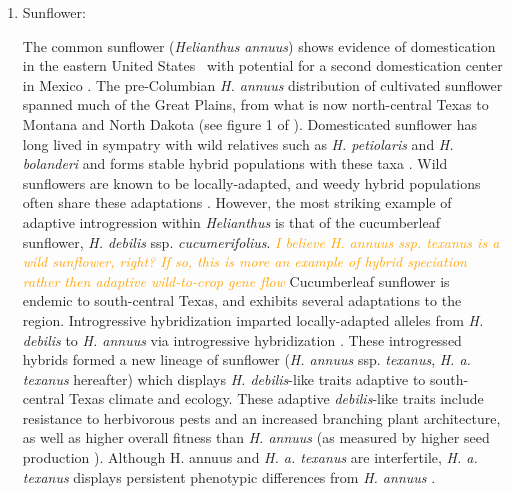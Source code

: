 \documentclass[11pt]{article}
\newcommand{\mbh}[1]{\textcolor{orange}{ \emph{\scriptsize  #1}} } %
\begin{document}
\begin{enumerate}
\item{Sunflower: }

The common sunflower (\emph{Helianthus annuus}) shows evidence of domestication in the eastern United States \cite{harter2004origin, wills2006chloroplast}\, with potential for a second domestication center in Mexico \cite{lentz2008sunflower}.
The pre-Columbian \emph{H. annuus} distribution of cultivated sunflower spanned much of the Great Plains, from what is now north-central Texas to Montana and North Dakota (see figure 1 of \cite{whitney2010adaptive}).
Domesticated sunflower has long lived in sympatry with wild relatives such as \emph{H. petiolaris} and \emph{H. bolanderi} and forms stable hybrid populations with these taxa \cite{schwarzbach2002likely, rieseberg1988molecular, welch2002patterns}.
Wild sunflowers are known to be locally-adapted, and weedy hybrid populations often share these adaptations \cite{kane2008genetics}.
However, the most striking example of adaptive introgression within \emph{Helianthus} is that of the cucumberleaf sunflower, \emph{H. debilis} ssp. \emph{cucumerifolius}.
\mbh{I believe \emph{H. annuus} ssp. \emph{texanus} is a wild sunflower, right?  If so, this is more an example of hybrid speciation rather then adaptive wild-to-crop gene flow}
Cucumberleaf sunflower is endemic to south-central Texas, and exhibits several adaptations to the region.
Introgressive hybridization imparted locally-adapted alleles from \emph{H. debilis} to \emph{H. annuus} via introgressive hybridization \cite{heiser1951hybridization}. 
These introgressed hybrids formed a new lineage of sunflower (\emph{H. annuus} ssp. \emph{texanus}, \emph{H. a. texanus} hereafter) which displays \emph{H. debilis}-like traits adaptive to south-central Texas climate and ecology.
These adaptive \emph{debilis}-like traits include resistance to herbivorous pests and an increased branching plant architecture, as well as higher overall fitness than \emph{H. annuus} (as measured by higher seed production \cite{whitney2006adaptive}).
Although H. annuus and \emph{H. a. texanus} are interfertile, \emph{H. a. texanus} displays persistent phenotypic differences from \emph{H. annuus} \cite{rieseberg2007hybridization}.



\end{enumerate}
\end{document}
